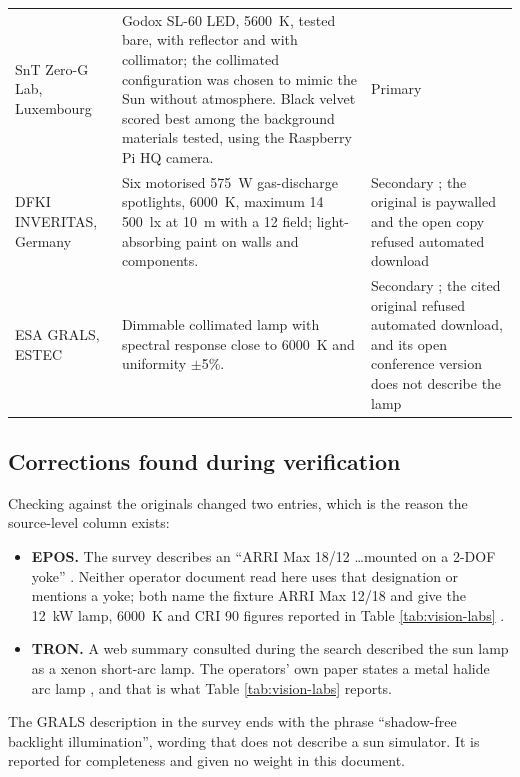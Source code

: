 \begin{table}[!ht]
\begin{tabularx}{\textwidth}{p{} X p{}}
SnT Zero-G Lab, Luxembourg & Godox SL-60 LED, 5600~K, tested bare, with reflector and with collimator; the collimated configuration was chosen to mimic the Sun without atmosphere. Black velvet scored best among the background materials tested, using the Raspberry Pi HQ camera. & Primary \cite{pauly2022spacelab} \\
DFKI INVERITAS, Germany & Six motorised 575~W gas-discharge spotlights, 6000~K, maximum 14\,500~lx at 10~m with a 12\textdegree{} field; light-absorbing paint on walls and components. & Secondary \cite{pauly2022spacelab}; the original \cite{paul2015inveritas} is paywalled and the open copy refused automated download \\
ESA GRALS, ESTEC & Dimmable collimated lamp with spectral response close to 6000~K and uniformity $\pm$5\%. & Secondary \cite{pauly2022spacelab}; the cited original \cite{cassinis2022grals} refused automated download, and its open conference version does not describe the lamp \\
\bottomrule
\end{tabularx}
\end{table}

\subsection{Corrections found during verification}

Checking against the originals changed two entries, which is the reason the source-level column exists:

\begin{itemize}
    \item \textbf{EPOS.} The survey describes an ``ARRI Max 18/12 \dots mounted on a 2-DOF yoke'' \cite{pauly2022spacelab}. Neither operator document read here uses that designation or mentions a yoke; both name the fixture ARRI Max 12/18 and give the 12~kW lamp, 6000~K and CRI 90 figures reported in Table \ref{tab:vision-labs} \cite{benninghoff2017epos,dlr2025eposportfolio}.
    \item \textbf{TRON.} A web summary consulted during the search described the sun lamp as a xenon short-arc lamp. The operators' own paper states a metal halide arc lamp \cite{park2021tron}, and that is what Table \ref{tab:vision-labs} reports.
\end{itemize}

The GRALS description in the survey ends with the phrase ``shadow-free backlight illumination'', wording that does not describe a sun simulator. It is reported for completeness and given no weight in this document.

